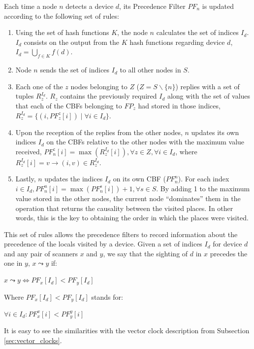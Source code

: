 Each time a node $n$ detects a device $d$, its Precedence Filter
$PF_n$ is updated according to the following set of rules:
\begin{enumerate}
\item Using the set of hash functions $K$, the node $n$ calculates the
  set of indices $I_d$. $I_d$ consists on the output from the $K$ hash
  functions regarding device $d$, $I_d=\bigcup_{f \in K} f(d)$.
\item Node $n$ sends the set of indices $I_d$ to all other nodes
  in $S$.
\item Each one of the $z$ nodes belonging to $Z$ ($Z = S \backslash
  \{n\}$) replies with a set of tuples $R_z^{I_d}$. $R_z$ contains
  the previously required $I_d$ along with the set of values that each
  of the CBFs belonging to $FP_z$ had stored in those indices,
    $R_z^{I_d}= \{(i,PF_z^z[i]) \mid \forall i \in I_d \}$.
\item Upon the reception of the replies from the other nodes, $n$
  updates its own indices $I_d$ on the CBFs relative to the other
  nodes with the maximum value received, $PF_n^z[i] = \max(R_z^{I_d}[i]), \forall
  z \in Z, \forall i \in I_d$, where $R_z^{I_d}[i] = v \rightarrow (i,v) \in R_z^{I_d}$.
\item Lastly, $n$ updates the indices $I_d$ on its own CBF
  ($PF_n^n$). For each index $i \in I_d, PF_n^n[i] = \max(PF_n^s[i])+1,
  \forall s \in S$. By adding 1 to the maximum value stored in the
  other nodes, the current node ``dominates'' them in the operation
  that returns the causality between the visited places. In other
  words, this is the key to obtaining the order in which the places were
  visited.
\end{enumerate}

This set of rules allows the precedence filters to record information
about the precedence of the locals visited by a device. Given a set of
indices $I_d$ for device $d$ and any pair of scanners $x$ and $y$, we
say that the sighting of $d$ in $x$ precedes the one in $y$, $x
\leadsto y$ if:

\begin{center}
\begin{math}
	x\leadsto y \Longleftrightarrow PF_{x}[I_d] < PF_{y}[I_d]
\end{math}
\end{center}
Where $PF_x[I_d] < PF_y[I_d]$ stands for:
\begin{center}
  \begin{math}
    \forall i \in I_d : PF_x^x[i] < PF_y^y[i]
  \end{math}

\end{center}
It is easy to see the similarities with the vector clock description
from Subsection \ref{sec:vector_clocks}.

